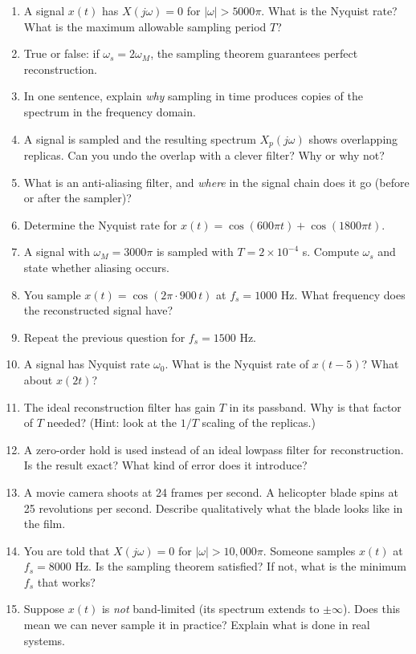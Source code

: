 \documentclass[11pt]{article}
\begin{document}
\begin{enumerate}
  \item A signal $x(t)$ has $X(j\omega) = 0$ for $|\omega| > 5000\pi$. What is the Nyquist rate? What is the maximum allowable sampling period $T$?
  \item True or false: if $\omega_s = 2\omega_M$, the sampling theorem guarantees perfect reconstruction.
  \item In one sentence, explain \textit{why} sampling in time produces copies of the spectrum in the frequency domain.
  \item A signal is sampled and the resulting spectrum $X_p(j\omega)$ shows overlapping replicas. Can you undo the overlap with a clever filter? Why or why not?
  \item What is an anti-aliasing filter, and \textit{where} in the signal chain does it go (before or after the sampler)?
  \item Determine the Nyquist rate for $x(t) = \cos(600\pi t) + \cos(1800\pi t)$.
  \item A signal with $\omega_M = 3000\pi$ is sampled with $T = 2 \times 10^{-4}$ s. Compute $\omega_s$ and state whether aliasing occurs.
  \item You sample $x(t) = \cos(2\pi \cdot 900\,t)$ at $f_s = 1000$ Hz. What frequency does the reconstructed signal have?
  \item Repeat the previous question for $f_s = 1500$ Hz.
  \item A signal has Nyquist rate $\omega_0$. What is the Nyquist rate of $x(t-5)$? What about $x(2t)$?
  \item The ideal reconstruction filter has gain $T$ in its passband. Why is that factor of $T$ needed? (Hint: look at the $1/T$ scaling of the replicas.)
  \item A zero-order hold is used instead of an ideal lowpass filter for reconstruction. Is the result exact? What kind of error does it introduce?
  \item A movie camera shoots at 24 frames per second. A helicopter blade spins at 25 revolutions per second. Describe qualitatively what the blade looks like in the film.
  \item You are told that $X(j\omega) = 0$ for $|\omega| > 10{,}000\pi$. Someone samples $x(t)$ at $f_s = 8000$ Hz. Is the sampling theorem satisfied? If not, what is the minimum $f_s$ that works?
  \item Suppose $x(t)$ is \textit{not} band-limited (its spectrum extends to $\pm\infty$). Does this mean we can never sample it in practice? Explain what is done in real systems.
\end{enumerate}
\end{document}
